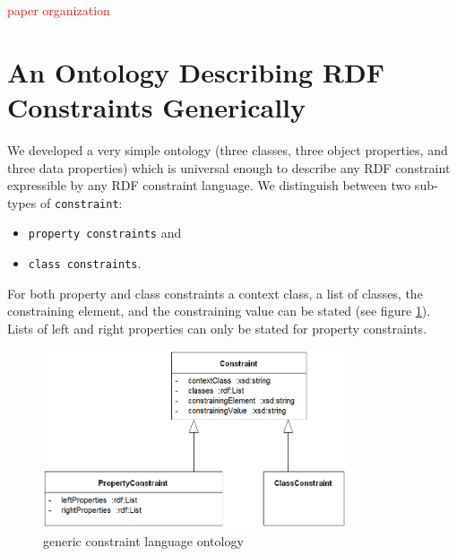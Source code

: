 \documentclass{llncs}
\newcommand{\ms}[1]{\texttt{#1}}
\begin{document}
\textcolor{red}{paper organization}

\section{An Ontology Describing RDF Constraints Generically} 
\label{sec:ontology}

We developed a very simple ontology (three classes, three object properties, and three data properties) which is universal enough to describe any RDF constraint expressible by any RDF constraint language.
We distinguish between two sub-types of \ms{constraint}: 
\begin{itemize}
	\item \ms{property constraints} and 
	\item \ms{class constraints}. 
\end{itemize}

For both property and class constraints a context class, a list of classes, the constraining element, and the constraining value can be stated
(see figure \ref{fig:generic-constraint-language-ontology}). Lists of left and right properties can only be stated for property constraints.

\begin{figure}
	\centering
		\includegraphics[width=0.80\textwidth]{images/generic-constraint-language-ontology.png}
	\caption{generic constraint language ontology}
	\label{fig:generic-constraint-language-ontology}
\end{figure}
\end{document}
